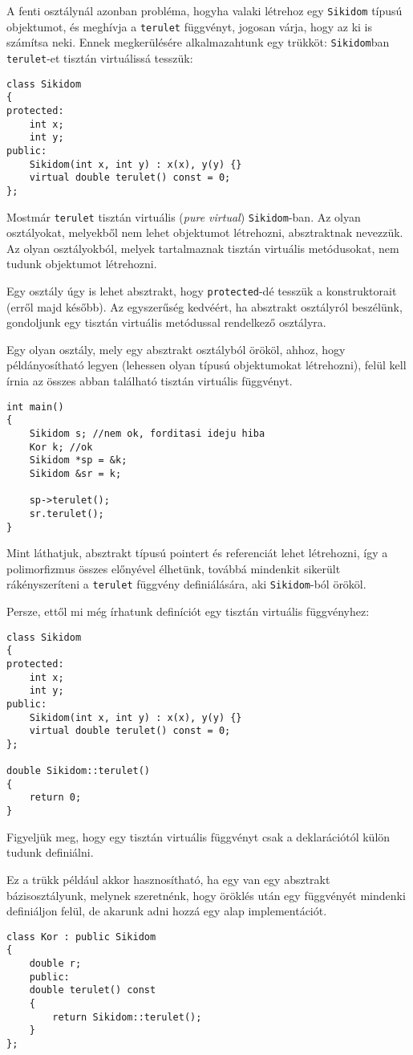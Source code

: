 \documentclass[a4paper,11.5pt]{article}
\begin{document}
	A fenti osztálynál azonban probléma, hogyha valaki létrehoz egy \texttt{Sikidom} típusú objektumot, és meghívja a \texttt{terulet} függvényt, jogosan várja, hogy az ki is számítsa neki. Ennek megkerülésére alkalmazahtunk egy trükköt: \texttt{Sikidom}ban \texttt{terulet}-et tisztán virtuálissá tesszük:
	
\begin{lstlisting}
class Sikidom
{
protected:
	int x;
	int y;
public:
	Sikidom(int x, int y) : x(x), y(y) {}
	virtual double terulet() const = 0;
};
\end{lstlisting}
	Mostmár \texttt{terulet} tisztán virtuális (\textit{pure virtual}) \texttt{Sikidom}-ban. Az olyan osztályokat, melyekből nem lehet objektumot létrehozni, absztraktnak nevezzük. Az olyan osztályokból, melyek tartalmaznak tisztán virtuális metódusokat, nem tudunk objektumot létrehozni.
	\begin{note}
		Egy osztály úgy is lehet absztrakt, hogy \texttt{protected}-dé tesszük a konstruktorait (erről majd később). Az egyszerűség kedvéért, ha absztrakt osztályról beszélünk, gondoljunk egy tisztán virtuális metódussal rendelkező osztályra.
	\end{note}
	Egy olyan osztály, mely egy absztrakt osztályból örököl, ahhoz, hogy példányosítható legyen (lehessen olyan típusú objektumokat létrehozni), felül kell írnia az összes abban található tisztán virtuális függvényt.
	\begin{lstlisting}
int main()
{
	Sikidom s; //nem ok, forditasi ideju hiba
	Kor k; //ok
	Sikidom *sp = &k;
	Sikidom &sr = k;
	
	sp->terulet();
	sr.terulet();
}
	\end{lstlisting}
	Mint láthatjuk, absztrakt típusú pointert és referenciát lehet létrehozni, így a polimorfizmus összes előnyével élhetünk, továbbá mindenkit sikerült rákényszeríteni a \texttt{terulet} függvény definiálására, aki \texttt{Sikidom}-ból örököl.
	
	Persze, ettől mi még írhatunk definíciót egy tisztán virtuális függvényhez:
\begin{lstlisting}
class Sikidom
{
protected:
	int x;
	int y;
public:
	Sikidom(int x, int y) : x(x), y(y) {}
	virtual double terulet() const = 0;
};

double Sikidom::terulet()
{
	return 0;
}
\end{lstlisting}
	Figyeljük meg, hogy egy tisztán virtuális függvényt csak a deklarációtól külön tudunk definiálni. 
	
	Ez a trükk például akkor hasznosítható, ha egy van egy absztrakt bázisosztályunk, melynek szeretnénk, hogy öröklés után egy függvényét mindenki definiáljon felül, de akarunk adni hozzá egy alap implementációt.
\begin{lstlisting}
class Kor : public Sikidom
{
	double r;
	public:
	double terulet() const
	{
		return Sikidom::terulet();
	}
};
\end{lstlisting}
	
\end{document}
